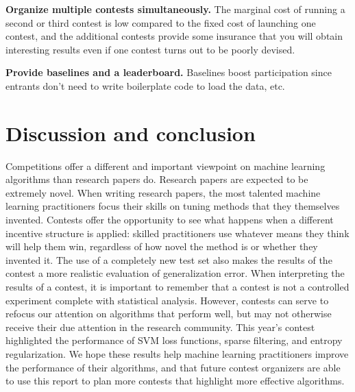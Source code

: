 \documentclass{llncs}
\begin{document}
{\bf Organize multiple contests simultaneously.} The marginal cost of running a second
or third contest is low compared to the fixed cost of launching one contest, and the additional contests provide
some insurance that you will obtain interesting results even if one contest turns out to be poorly devised. 

{\bf Provide baselines and a leaderboard.} Baselines boost participation since entrants don't
need to write boilerplate code to load the data, etc.


\section{Discussion and conclusion}

Competitions offer a different and important viewpoint on machine learning algorithms than research papers do.
Research papers are expected to be extremely novel. When writing research papers, the most talented machine learning practitioners
focus their skills on tuning methods that they themselves invented. Contests offer the opportunity to see what happens when
a different incentive structure is applied: skilled practitioners use whatever means they think will help them win, regardless of
how novel the method is or whether they invented it.
The use of a completely new test set also makes the results of the contest a more realistic evaluation of generalization error.
When interpreting the results of a contest, it is important to remember that
a contest is not a controlled experiment complete with statistical analysis. However, contests can serve to refocus our attention
on algorithms that perform well, but may not otherwise receive their due attention in the research community. This year's contest
highlighted the performance of SVM loss functions, sparse filtering, and entropy regularization. We hope these results help machine
learning practitioners improve the performance of their algorithms, and that future contest organizers are able to use this report
to plan more contests that highlight more effective algorithms.
\end{document}
